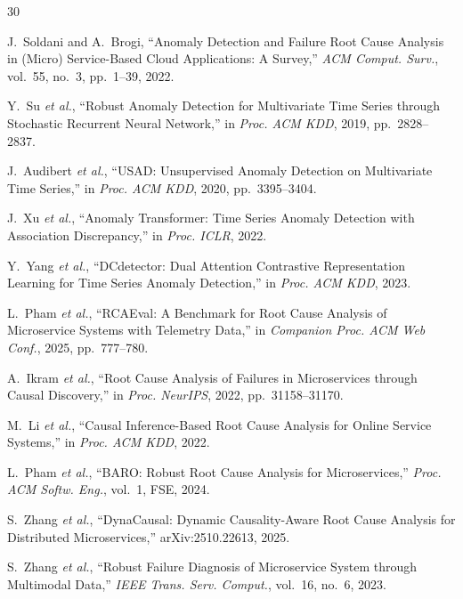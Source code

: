\documentclass[12pt,a4paper]{report}
\begin{document}
\begingroup\sloppy
\begin{thebibliography}{30}

J.~Soldani and A.~Brogi, ``Anomaly Detection and Failure Root Cause Analysis in (Micro) Service-Based Cloud Applications: A Survey,'' \emph{ACM Comput. Surv.}, vol.~55, no.~3, pp.~1--39, 2022.

Y.~Su \emph{et al.}, ``Robust Anomaly Detection for Multivariate Time Series through Stochastic Recurrent Neural Network,'' in \emph{Proc. ACM KDD}, 2019, pp.~2828--2837.

J.~Audibert \emph{et al.}, ``USAD: Unsupervised Anomaly Detection on Multivariate Time Series,'' in \emph{Proc. ACM KDD}, 2020, pp.~3395--3404.

J.~Xu \emph{et al.}, ``Anomaly Transformer: Time Series Anomaly Detection with Association Discrepancy,'' in \emph{Proc. ICLR}, 2022.

Y.~Yang \emph{et al.}, ``DCdetector: Dual Attention Contrastive Representation Learning for Time Series Anomaly Detection,'' in \emph{Proc. ACM KDD}, 2023.

L.~Pham \emph{et al.}, ``RCAEval: A Benchmark for Root Cause Analysis of Microservice Systems with Telemetry Data,'' in \emph{Companion Proc. ACM Web Conf.}, 2025, pp.~777--780.

A.~Ikram \emph{et al.}, ``Root Cause Analysis of Failures in Microservices through Causal Discovery,'' in \emph{Proc. NeurIPS}, 2022, pp.~31158--31170.

M.~Li \emph{et al.}, ``Causal Inference-Based Root Cause Analysis for Online Service Systems,'' in \emph{Proc. ACM KDD}, 2022.

L.~Pham \emph{et al.}, ``BARO: Robust Root Cause Analysis for Microservices,'' \emph{Proc. ACM Softw. Eng.}, vol.~1, FSE, 2024.

S.~Zhang \emph{et al.}, ``DynaCausal: Dynamic Causality-Aware Root Cause Analysis for Distributed Microservices,'' arXiv:2510.22613, 2025.

S.~Zhang \emph{et al.}, ``Robust Failure Diagnosis of Microservice System through Multimodal Data,'' \emph{IEEE Trans. Serv. Comput.}, vol.~16, no.~6, 2023.


\end{thebibliography}
\end{document}
